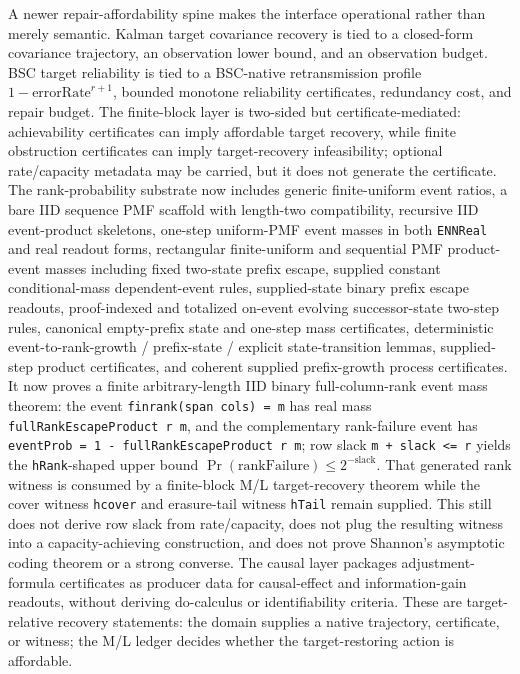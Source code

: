 \documentclass[11pt,a4paper]{article}
\begin{document}
A newer repair-affordability spine makes the interface operational rather than merely semantic. Kalman target covariance recovery is tied to a closed-form covariance trajectory, an observation lower bound, and an observation budget. BSC target reliability is tied to a BSC-native retransmission profile $1-\mathrm{errorRate}^{r+1}$, bounded monotone reliability certificates, redundancy cost, and repair budget. The finite-block layer is two-sided but certificate-mediated: achievability certificates can imply affordable target recovery, while finite obstruction certificates can imply target-recovery infeasibility; optional rate/capacity metadata may be carried, but it does not generate the certificate. The rank-probability substrate now includes generic finite-uniform event ratios, a bare IID sequence PMF scaffold with length-two compatibility, recursive IID event-product skeletons, one-step uniform-PMF event masses in both \texttt{ENNReal} and real readout forms, rectangular finite-uniform and sequential PMF product-event masses including fixed two-state prefix escape, supplied constant conditional-mass dependent-event rules, supplied-state binary prefix escape readouts, proof-indexed and totalized on-event evolving successor-state two-step rules, canonical empty-prefix state and one-step mass certificates, deterministic event-to-rank-growth / prefix-state / explicit state-transition lemmas, supplied-step product certificates, and coherent supplied prefix-growth process certificates. It now proves a finite arbitrary-length IID binary full-column-rank event mass theorem: the event \texttt{finrank(span cols) = m} has real mass \texttt{fullRankEscapeProduct r m}, and the complementary rank-failure event has \texttt{eventProb = 1 - fullRankEscapeProduct r m}; row slack \texttt{m + slack <= r} yields the \texttt{hRank}-shaped upper bound $\Pr(\mathrm{rankFailure}) \le 2^{-\mathrm{slack}}$. That generated rank witness is consumed by a finite-block M/L target-recovery theorem while the cover witness \texttt{hcover} and erasure-tail witness \texttt{hTail} remain supplied. This still does not derive row slack from rate/capacity, does not plug the resulting witness into a capacity-achieving construction, and does not prove Shannon's asymptotic coding theorem or a strong converse. The causal layer packages adjustment-formula certificates as producer data for causal-effect and information-gain readouts, without deriving do-calculus or identifiability criteria. These are target-relative recovery statements: the domain supplies a native trajectory, certificate, or witness; the M/L ledger decides whether the target-restoring action is affordable.
\end{document}
